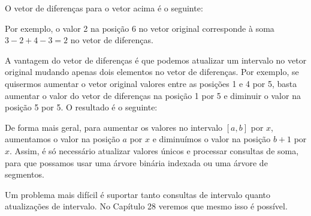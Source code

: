 O vetor de diferenças para o vetor acima é o seguinte:
\begin{center}
\end{center}

Por exemplo, o valor 2 na posição 6 no vetor original
corresponde à soma $3-2+4-3=2$ no vetor de diferenças.

A vantagem do vetor de diferenças é
que podemos atualizar um intervalo
no vetor original mudando apenas
dois elementos no vetor de diferenças.
Por exemplo, se quisermos
aumentar o vetor original
valores entre as posições 1 e 4 por 5,
basta aumentar o
valor do vetor de diferenças na posição 1 por 5
e diminuir o valor na posição 5 por 5.
O resultado é o seguinte:

\begin{center}
\end{center}

De forma mais geral, para aumentar os valores
no intervalo $[a,b]$ por $x$,
aumentamos o valor na posição $a$ por $x$
e diminuímos o valor na posição $b+1$ por $x$.
Assim, é só necessário atualizar valores únicos
e processar consultas de soma,
para que possamos usar uma árvore binária indexada ou uma árvore de segmentos.

Um problema mais difícil é suportar tanto
consultas de intervalo quanto atualizações de intervalo.
No Capítulo 28 veremos que mesmo isso é possível.





